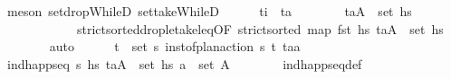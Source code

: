 \begin{isabellebody}
\ {\isacharparenleft}{\kern0pt}meson\ set{\isacharunderscore}{\kern0pt}dropWhileD\ set{\isacharunderscore}{\kern0pt}takeWhileD{\isacharparenright}{\kern0pt}\isanewline
\ \ \ \ \isamarkupfalse%
\ {\isachardoublequoteopen}t\isactrlsub i\ {\isacharequal}{\kern0pt}\ t\isactrlsub a{\isachardoublequoteclose}\isanewline
\ \ \ \ \ \ \isamarkupfalse%
\ {\isacartoucheopen}{\isacharparenleft}{\kern0pt}t\isactrlsub a{\isacharcomma}{\kern0pt}A{\isacharparenright}{\kern0pt}\ {\isasymin}\ set\ {\isacharquery}{\kern0pt}hs\isanewline
\ \ \ \ \ \ \ \ \ \ \ \ strict{\isacharunderscore}{\kern0pt}sorted{\isacharunderscore}{\kern0pt}drop{\isacharunderscore}{\kern0pt}le{\isacharunderscore}{\kern0pt}take{\isacharunderscore}{\kern0pt}leq{\isacharbrackleft}{\kern0pt}OF\ {\isacartoucheopen}strict{\isacharunderscore}{\kern0pt}sorted\ {\isacharparenleft}{\kern0pt}map\ fst\ hs\ {\isacartoucheopen}{\isacharparenleft}{\kern0pt}t\isactrlsub a{\isacharcomma}{\kern0pt}A{\isacharparenright}{\kern0pt}\ {\isasymin}\ set\ hs\isanewline
\ \ \ \ \ \ \isamarkupfalse%
\ auto\isanewline
\ \ \ \ \isamarkupfalse%
\ {\isachardoublequoteopen}{\isasymexists}{\isacharparenleft}{\kern0pt}t\isactrlsub {\isasympi}{\isacharcomma}{\kern0pt}{\isasympi}{\isacharparenright}{\kern0pt}\ {\isasymin}\ set\ {\isasympi}s{\isachardot}{\kern0pt}\ inst{\isacharunderscore}{\kern0pt}of{\isacharunderscore}{\kern0pt}plan{\isacharunderscore}{\kern0pt}action\ {\isasympi}s\ {\isacharparenleft}{\kern0pt}t\isactrlsub {\isasympi}{\isacharcomma}{\kern0pt}{\isasympi}{\isacharparenright}{\kern0pt}\ {\isacharparenleft}{\kern0pt}t\isactrlsub a{\isacharcomma}{\kern0pt}a{\isacharparenright}{\kern0pt}{\isachardoublequoteclose}\isanewline
\ \ \ \ \ \ \isamarkupfalse%
\ {\isacartoucheopen}ind{\isacharunderscore}{\kern0pt}happ{\isacharunderscore}{\kern0pt}seq\ {\isasympi}s\ hs\ {\isacartoucheopen}{\isacharparenleft}{\kern0pt}t\isactrlsub a{\isacharcomma}{\kern0pt}A{\isacharparenright}{\kern0pt}\ {\isasymin}\ set\ hs\ {\isacartoucheopen}a\ {\isasymin}\ set\ A{\isacartoucheclose}\isanewline
\ \ \ \ \ \ \isamarkupfalse%
\ ind{\isacharunderscore}{\kern0pt}happ{\isacharunderscore}{\kern0pt}seq{\isacharunderscore}{\kern0pt}def\ \isamarkupfalse%

\end{isabellebody}
